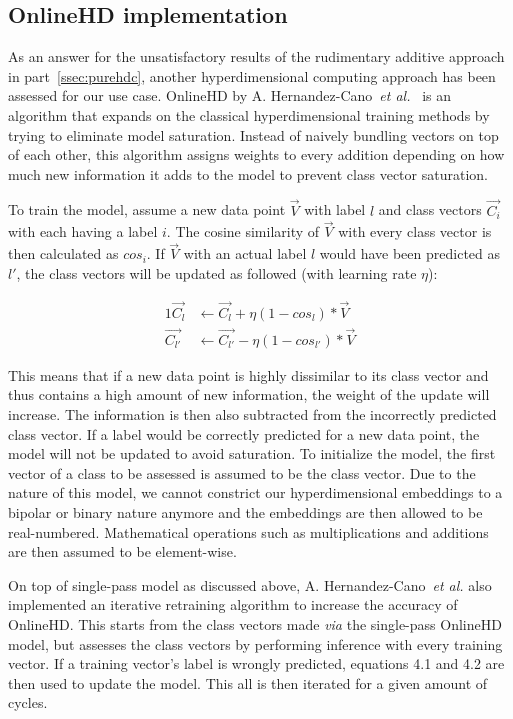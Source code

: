 \subsection*{OnlineHD implementation}
As an answer for the unsatisfactory results of the rudimentary additive approach in part~\ref{ssec:purehdc}, another hyperdimensional computing approach has been assessed for our use case. OnlineHD by A. Hernandez-Cano~\textit{et al.}~\cite{onlinehd} is an algorithm that expands on the classical hyperdimensional training methods by trying to eliminate model saturation. Instead of naively bundling vectors on top of each other, this algorithm assigns weights to every addition  depending on how much new information it adds to the model to prevent class vector saturation.

To train the model, assume a new data point $\vec{V}$ with label $l$ and class vectors $\vec{C_{i}}$ with each having a label $i$. The cosine similarity of $\vec{V}$ with every class vector is then calculated as $cos_{i}$. If $\vec{V}$ with an actual label $l$ would have been predicted as $l'$, the class vectors will be updated as followed (with learning rate $\eta$):

\begin{alignat}{1}
    \label{eqn:onlinehd}
    \vec{C_{l}} &\leftarrow \vec{C_{l}} + \eta (1 - cos_{l}) * \vec{V} \\
    \vec{C_{l'}} &\leftarrow \vec{C_{l'}} - \eta (1 - cos_{l'}) * \vec{V}
\end{alignat}

This means that if a new data point is highly dissimilar to its class vector and thus contains a high amount of new information, the weight of the update will increase. The information is then also subtracted from the incorrectly predicted class vector. If a label would be correctly predicted for a new data point, the model will not be updated to avoid saturation. To initialize the model, the first vector of a class to be assessed is assumed to be the class vector. Due to the nature of this model, we cannot constrict our hyperdimensional embeddings to a bipolar or binary nature anymore and the embeddings are then allowed to be real-numbered. Mathematical operations such as multiplications and additions are then assumed to be element-wise.

On top of single-pass model as discussed above, A. Hernandez-Cano~\textit{et al.} also implemented an iterative retraining algorithm to increase the accuracy of OnlineHD. This starts from the class vectors made \textit{via} the single-pass OnlineHD model, but assesses the class vectors by performing inference with every training vector. If a training vector's label is wrongly predicted, equations 4.1 and 4.2 are then used to update the model. This all is then iterated for a given amount of cycles.

